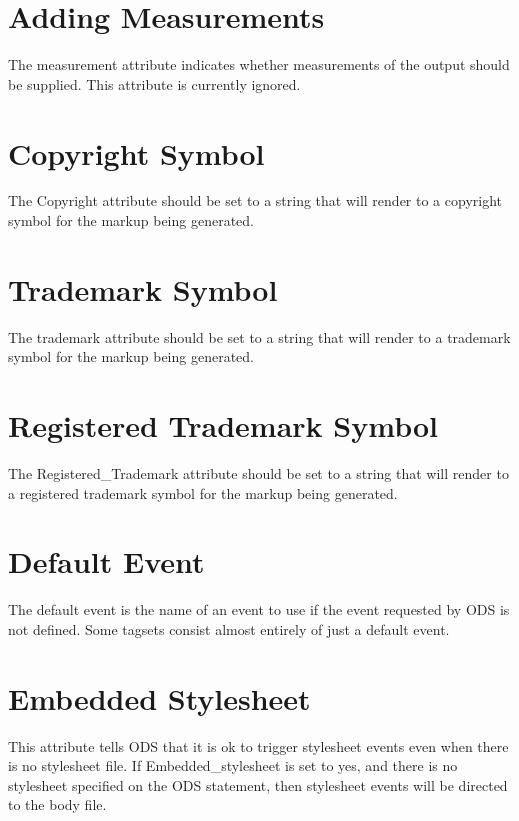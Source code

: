 \section{Adding Measurements}
The measurement attribute indicates whether measurements of the output should be
supplied.  This attribute is currently ignored.  

\section{Copyright Symbol}
The Copyright attribute should be set to a string that will render to a 
copyright symbol for the markup being generated.

\section{Trademark Symbol}
The trademark attribute should be set to a string that will render to a 
trademark symbol for the markup being generated.

\section{Registered Trademark Symbol}
The Registered\_Trademark attribute should be set to a string that will render to a 
registered trademark symbol for the markup being generated.

\section{Default Event}
The default event is the name of an event to use if the event requested by ODS
is not defined.  Some tagsets consist almost entirely of just a default event.

\section{Embedded Stylesheet}
This attribute tells ODS that it is ok to trigger stylesheet events even when there
is no stylesheet file.  If Embedded\_stylesheet is set to yes, and there is no stylesheet
specified on the ODS statement, then stylesheet events will be directed to the body file.

